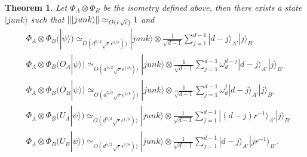 \documentclass[11pt,letterpaper]{article}
\newcommand{\ket}[1]{|#1\rangle}
\newcommand{\x}{\otimes}
\DeclarePairedDelimiter{\norm}{\lVert}{\rVert}
\newcommand{\1}{\mathbb{1}}
\newcommand{\ep}{\epsilon}
\newcommand{\se}{\sqrt{\epsilon}}
\newcommand{\sr}{\sqrt{r}}
\newcommand{\appd}[1]{\simeq_{#1}}
\newtheorem{theorem}{Theorem}
\theoremstyle{definition}
\begin{document}
\begin{theorem}
	Let $\Phi_A \x \Phi_B$ be the isometry defined above, then there exists a state $\ket{junk}$
	such that $\norm{\ket{junk}} \appd{O(r\se)} 1$ and 
	\begin{align}
		&\Phi_A \x \Phi_B (\ket{\psi}) \appd{O(d^{5/2}\sr \ep^{1/8}))} \ket{junk} \x \frac{1}{\sqrt{d-1}}\sum_{j=1}^{d-1} \ket{d-j}_{A'}\ket{j}_{B'}\\
		&\Phi_A \x \Phi_B (O_A\ket{\psi}) \appd{O(d^{5/2}\sr \ep^{1/8}))} \ket{junk} \x 
		\frac{1}{\sqrt{d-1}}\sum_{j=1}^{d-1} \omega_d^{d-j}\ket{d-j}_{A'}\ket{j}_{B'} \\
		&\Phi_A \x \Phi_B (O_B\ket{\psi}) \appd{O(d^{5/2}\sr \ep^{1/8}))} \ket{junk} \x 
		\frac{1}{\sqrt{d-1}}\sum_{j=1}^{d-1} \omega_d^{j}\ket{d-j}_{A'}\ket{j}_{B'}\\
		&\Phi_A \x \Phi_B (U_A\ket{\psi}) \appd{O(d^{5/2}\sr \ep^{1/8}))} \ket{junk} \x 
		\frac{1}{\sqrt{d-1}}\sum_{j=1}^{d-1} \ket{(d-j)r^{-1}}_{A'}\ket{j}_{B'} \\
		&\Phi_A \x \Phi_B (U_B\ket{\psi}) \appd{O(d^{5/2}\sr \ep^{1/8}))} \ket{junk} \x 
		\frac{1}{\sqrt{d-1}}\sum_{j=1}^{d-1} \ket{d-j}_{A'}\ket{j r^{-1}}_{B'}.
	\end{align}
\end{theorem}
\end{document}
